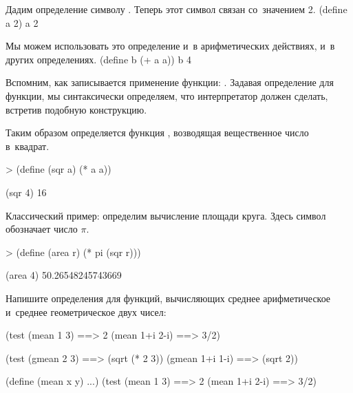 \begin{example}{%
Дадим определение символу . Теперь этот символ связан со~значением 2.}
\REPLin
  {(define a 2)}
\REPL
  {a}
  {2}
\end{example}


\begin{example}{%
Мы можем использовать это определение и~в арифметических действиях, и~в других определениях.}
\REPLin
  {(define b (+ a a))}
\REPL
  {b}
  {4}
\end{example}

Вспомним, как записывается применение функции: . Задавая определение для функции, мы синтаксически определяем, что интерпретатор должен сделать, встретив подобную конструкцию.

\begin{example}{%
Таким образом определяется функция , возводящая вещественное число в~квадрат.}
\begin{ExampleCode}
> (define (sqr a)
    (* a a))
\end{ExampleCode}
\REPL
  {(sqr 4)}
  {16}
\end{example}

\begin{example}{%
Классический пример: определим вычисление площади круга. Здесь символ  обозначает число $\pi$.}
\begin{ExampleCode}
> (define (area r)
    (* pi (sqr r)))
\end{ExampleCode}
\REPL
  {(area 4)}
  {50.26548245743669}
\end{example}

\begin{Assignment}
Напишите определения для функций, вычисляющих среднее арифметическое и~среднее геометрическое двух чисел:

\begin{Specification}
  (test 
    (mean 1 3)     ==> 2
    (mean 1+i 2-i) ==> 3/2)%

  (test 
    (gmean 2 3)     ==> (sqrt (* 2 3))
    (gmean 1+i 1-i) ==> (sqrt 2))
\end{Specification}

\begin{Specification}

  (define (mean x y)  ...)
  (test 
    (mean 1 3)     ==> 2
    (mean 1+i 2-i) ==> 3/2)
\end{Specification}%

\end{Assignment}

